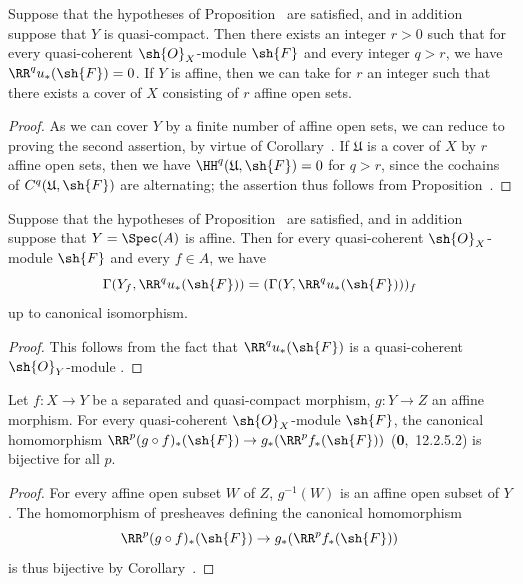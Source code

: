 \begin{corollary}[1.4.12]
\label{III.1.4.12}
Suppose that the hypotheses of Proposition~ are satisfied, and in addition suppose that $Y$ is quasi-compact.
Then there exists an integer $r>0$ such that for every quasi-coherent $\sh{O}_X$-module $\sh{F}$ and every integer $q>r$, we have $\RR^q u_*(\sh{F})=0$.
If $Y$ is affine, then we can take for $r$ an integer such that there exists a cover of $X$ consisting of $r$ affine open sets.
\end{corollary}

\begin{proof}
As we can cover $Y$ by a finite number of affine open sets, we can reduce to proving the second assertion, by virtue of Corollary~.
If $\mathfrak{U}$ is a cover of $X$ by $r$ affine open sets, then we have $\HH^q(\mathfrak{U},\sh{F})=0$ for $q>r$, since the cochains of $C^q(\mathfrak{U},\sh{F})$ are alternating; the assertion thus follows from Proposition~.
\end{proof}

\begin{corollary}[1.4.13]
\label{III.1.4.13}
Suppose that the hypotheses of Proposition~ are satisfied, and in addition suppose that $Y=\Spec(A)$ is affine.
Then for every quasi-coherent $\sh{O}_X$-module $\sh{F}$ and every $f\in A$, we have
\[
  \Gamma(Y_f,\RR^q u_*(\sh{F}))=(\Gamma(Y,\RR^q u_*(\sh{F})))_f
\]
up to canonical isomorphism.
\end{corollary}

\begin{proof}
This follows from the fact that $\RR^q u_*(\sh{F})$ is a quasi-coherent $\sh{O}_Y$-module .
\end{proof}

\begin{proposition}[1.4.14]
\label{III.1.4.14}
Let $f:X\to Y$ be a separated and quasi-compact morphism, $g:Y\to Z$ an affine morphism.
For every quasi-coherent $\sh{O}_X$-module $\sh{F}$, the canonical homomorphism $\RR^p(g\circ f)_*(\sh{F})\to g_*(\RR^p f_*(\sh{F}))$ (\textbf{0},~12.2.5.2) is bijective for all $p$.
\end{proposition}

\begin{proof}
For every affine open subset $W$ of $Z$, $g^{-1}(W)$ is an affine open subset of $Y$.
The homomorphism of presheaves defining the canonical homomorphism
\[
  \RR^p(g\circ f)_*(\sh{F})\to g_*(\RR^p f_*(\sh{F}))
\]
 is thus bijective by Corollary~.
\end{proof}

